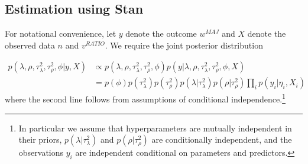 %
%



\subsection{Estimation using Stan}

For notational convenience, let $y$ denote the outcome $w^{MAJ}$ and $X$ denote the observed data $n$ and $v^{RATIO}$. We require the joint posterior distribution

{\singlespacing
\begin{align*}
p(\lambda, \rho, \tau^2_\lambda, \tau^2_\rho, \phi | y, X) & \propto p(\lambda, \rho, \tau^2_\lambda, \tau^2_\rho, \phi) p(y | \lambda, \rho, \tau^2_\lambda, \tau^2_\rho, \phi,  X)  \\
& = p(\phi) p(\tau^2_\lambda) p(\tau^2_\rho)  p(\lambda | \tau^2_\lambda) p(\rho | \tau^2_\rho) \prod_i p(y_i | \eta_i, X_i) 
\end{align*}
}
%
\noindent where the second line follows from assumptions of conditional independence.\footnote{In particular we assume that hyperparameters are mutually independent in their priors, $p(\lambda | \tau^2_\lambda)$ and $p(\rho | \tau^2_\rho)$ are conditionally independent, and the observations $y_i$ are independent conditional on parameters and predictors.}


